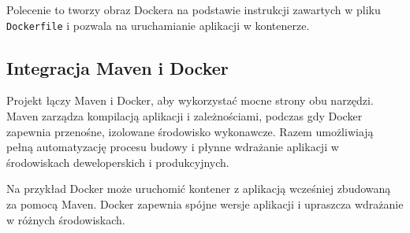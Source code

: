 Polecenie to tworzy obraz Dockera na podstawie instrukcji zawartych w pliku \texttt{Dockerfile} i pozwala na uruchamianie aplikacji w kontenerze.

\subsection{Integracja Maven i Docker}

Projekt łączy Maven i Docker, aby wykorzystać mocne strony obu narzędzi. Maven zarządza kompilacją aplikacji i zależnościami, podczas gdy Docker zapewnia przenośne, izolowane środowisko wykonawcze. Razem umożliwiają pełną automatyzację procesu budowy i płynne wdrażanie aplikacji w środowiskach deweloperskich i produkcyjnych.

Na przykład Docker może uruchomić kontener z aplikacją wcześniej zbudowaną za pomocą Maven. Docker zapewnia spójne wersje aplikacji i upraszcza wdrażanie w różnych środowiskach.
